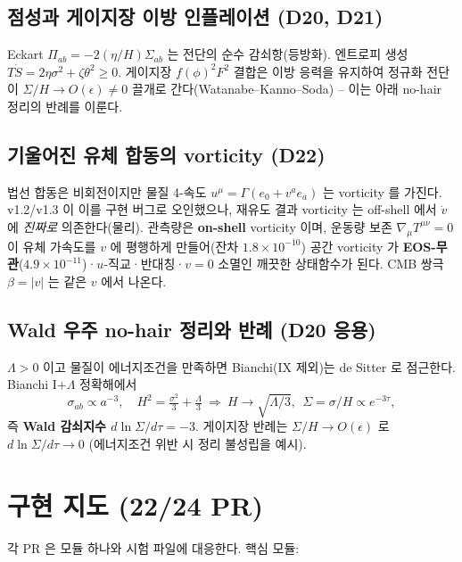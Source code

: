 \documentclass[11pt]{article}
\newcommand{\Sig}{\Sigma}
\begin{document}
\subsection{점성과 게이지장 이방 인플레이션 (D20, D21)}
Eckart $\Pi_{ab}=-2(\eta/H)\Sig_{ab}$ 는 전단의 순수 감쇠항(등방화). 엔트로피 생성
$T\dot S=2\eta\sigma^2+\zeta\theta^2\ge0$. 게이지장 $f(\phi)^2F^2$ 결합은 이방 응력을
유지하여 정규화 전단이 $\Sig/H\to O(\epsilon)\ne0$ 끌개로 간다(Watanabe--Kanno--Soda) --
이는 아래 no-hair 정리의 반례를 이룬다.

\subsection{기울어진 유체 합동의 vorticity (D22)}
법선 합동은 비회전이지만 물질 4-속도 $u^\mu=\Gamma(e_0+v^ae_a)$ 는 vorticity 를 가진다.
v1.2/v1.3 이 이를 구현 버그로 오인했으나, 재유도 결과 vorticity 는 off-shell 에서 $\dot v$ 에
\emph{진짜로} 의존한다(물리). 관측량은 \textbf{on-shell} vorticity 이며, 운동량 보존
$\nabla_\mu T^{\mu\nu}=0$ 이 유체 가속도를 $v$ 에 평행하게 만들어(잔차 $1.8\times10^{-10}$)
공간 vorticity 가 \textbf{EOS-무관}($4.9\times10^{-11}$)·$u$-직교·반대칭·$v{=}0$ 소멸인
깨끗한 상태함수가 된다. CMB 쌍극 $\beta=|v|$ 는 같은 $v$ 에서 나온다.

\subsection{Wald 우주 no-hair 정리와 반례 (D20 응용)}
$\Lambda>0$ 이고 물질이 에너지조건을 만족하면 Bianchi(IX 제외)는 de Sitter 로 점근한다.
Bianchi I$+\Lambda$ 정확해에서
\[
\sigma_{ab}\propto a^{-3},\quad H^2=\tfrac{\sigma^2}{3}+\tfrac{\Lambda}{3}
\ \Rightarrow\ H\to\sqrt{\Lambda/3},\ \ \Sig=\sigma/H\propto e^{-3\tau},
\]
즉 \textbf{Wald 감쇠지수 $d\ln\Sig/d\tau=-3$}. 게이지장 반례는 $\Sig/H\to O(\epsilon)$ 로
$d\ln\Sig/d\tau\to0$ (에너지조건 위반 시 정리 불성립을 예시).

\section{구현 지도 (22/24 PR)}

각 PR 은 모듈 하나와 시험 파일에 대응한다. 핵심 모듈:
\end{document}
